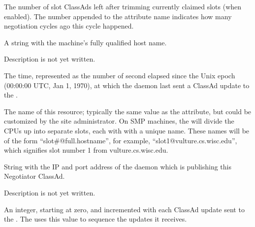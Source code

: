 \begin{description}
\label{attr:LastNegotiationCycleTrimmedSlots<X>}
\item[\AdAttr{LastNegotiationCycleTrimmedSlots<X>}:] 
The number of slot ClassAds left after trimming currently claimed slots 
(when enabled).
The number  appended to the attribute name indicates 
how many negotiation cycles ago this cycle happened.

\item[\AdAttr{Machine}:] A string with the machine's fully qualified 
  host name.

\item[\AdAttr{MyAddress}:] Description is not yet written.

\item[\AdAttr{MyCurrentTime}:]  The time, represented as the number of 
  second elapsed since the Unix epoch (00:00:00 UTC, Jan 1, 1970),
  at which the  daemon last sent a ClassAd update to the
  .

\item[\AdAttr{Name}:] The name of this resource; typically the same value as
  the  attribute, but could be customized by the site
  administrator.
  On SMP machines, the  will divide the CPUs up into separate
  slots, each with with a unique name.
  These names will be of the form ``slot\#@full.hostname'', for example,
  ``slot1@vulture.cs.wisc.edu'', which signifies slot number 1 from
  vulture.cs.wisc.edu.

\item[\AdAttr{NegotiatorIpAddr}:] String with the IP and port address of the
 daemon which is publishing this Negotiator ClassAd.

\item[\AdAttr{PublicNetworkIpAddr}:] Description is not yet written.

\item[\AdAttr{UpdateSequenceNumber}:] An integer, starting at zero,
  and incremented with each ClassAd update sent to the .
  The  uses this value to sequence the updates it
  receives.

\end{description}

